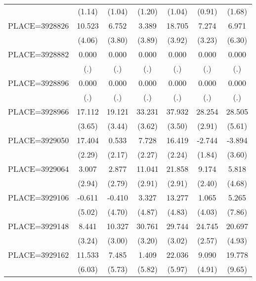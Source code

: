 {\begin{tabular}{l*{6}{c}}
                    &      (1.14)&      (1.04)&      (1.20)&      (1.04)&      (0.91)&      (1.68)\\
PLACE=3928826       &      10.523&       6.752&       3.389&      18.705&       7.274&       6.971\\
                    &      (4.06)&      (3.80)&      (3.89)&      (3.92)&      (3.23)&      (6.30)\\
PLACE=3928882       &       0.000&       0.000&       0.000&       0.000&       0.000&       0.000\\
                    &         (.)&         (.)&         (.)&         (.)&         (.)&         (.)\\
PLACE=3928896       &       0.000&       0.000&       0.000&       0.000&       0.000&       0.000\\
                    &         (.)&         (.)&         (.)&         (.)&         (.)&         (.)\\
PLACE=3928966       &      17.112&      19.121&      33.231&      37.932&      28.254&      28.505\\
                    &      (3.65)&      (3.44)&      (3.62)&      (3.50)&      (2.91)&      (5.61)\\
PLACE=3929050       &      17.404&       0.533&       7.728&      16.419&      -2.744&      -3.894\\
                    &      (2.29)&      (2.17)&      (2.27)&      (2.24)&      (1.84)&      (3.60)\\
PLACE=3929064       &       3.007&       2.877&      11.041&      21.858&       9.174&       5.818\\
                    &      (2.94)&      (2.79)&      (2.91)&      (2.91)&      (2.40)&      (4.68)\\
PLACE=3929106       &      -0.611&      -0.410&       3.327&      13.277&       1.065&       5.265\\
                    &      (5.02)&      (4.70)&      (4.87)&      (4.83)&      (4.03)&      (7.86)\\
PLACE=3929148       &       8.441&      10.327&      30.761&      29.744&      24.745&      20.697\\
                    &      (3.24)&      (3.00)&      (3.20)&      (3.02)&      (2.57)&      (4.93)\\
PLACE=3929162       &      11.533&       7.485&       1.409&      22.036&       9.090&      19.778\\
                    &      (6.03)&      (5.73)&      (5.82)&      (5.97)&      (4.91)&      (9.65)\\

\end{tabular}}
